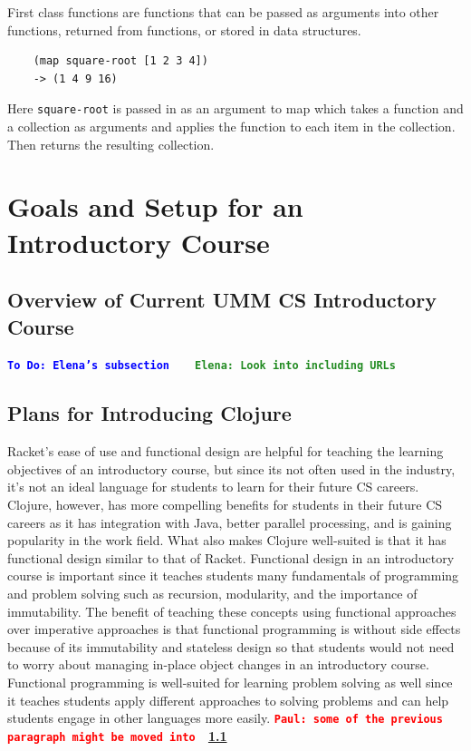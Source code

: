 \documentclass[12pt]{article}
\newcommand{\comment}[1]{{\bf \tt  {#1}}}
\newcommand{\emcomment}[1]{\textcolor{ForestGreen}{\comment{Elena: {#1}}}}
\newcommand{\todo}[1]{\textcolor{blue}{\comment{To Do: {#1}}}}
\newcommand{\pscomment}[1]{\textcolor{red}{\comment{Paul: {#1}}}}
\begin{document}
First class functions are functions that can be passed as arguments into other functions, returned from functions, or stored in data structures.
\begin{verbatim}
	(map square-root [1 2 3 4])
	-> (1 4 9 16)
\end{verbatim}
Here \texttt{square-root} is passed in as an argument to map which takes a function and a collection as arguments and applies the function to each item in the collection. Then returns the resulting collection.   

\section{Goals and Setup for an Introductory Course}\label{sec:racket-clojure}


\subsection{Overview of Current UMM CS Introductory Course}\label{subsec:course}
\todo{Elena's subsection}
~\cite{htdp}
~\cite{lein} \emcomment{Look into including URLs}

\subsection{Plans for Introducing Clojure}\label{subsec:plans}
Racket's ease of use and functional design are helpful for teaching the learning objectives of an introductory course, but since its not often used in the industry, it's not an ideal language for students to learn for their future CS careers. Clojure, however, has more compelling benefits for students in their future CS careers as it has integration with Java, better parallel processing, and is gaining popularity in the work field. What also makes Clojure well-suited is that it has functional design similar to that of Racket. Functional design in an introductory course is important since it teaches students many fundamentals of programming and problem solving such as recursion, modularity, and the importance of immutability. The benefit of teaching these concepts using functional approaches over imperative approaches is that functional programming is without side effects because of its immutability and stateless design so that students would not need to worry about managing in-place object changes in an introductory course. Functional programming is well-suited for learning problem solving as well since it teaches students apply different approaches to solving problems and can help students engage in other languages more easily.
\pscomment{some of the previous paragraph might be moved into ~\ref{subsec:course}}
\end{document}
